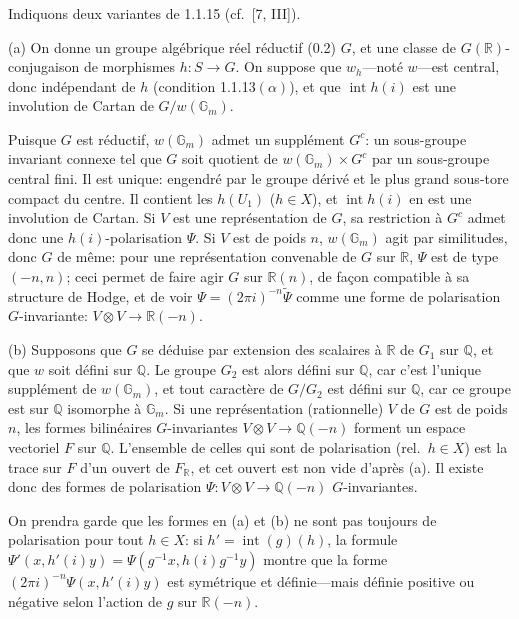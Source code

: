 \documentclass[12pt,a4paper]{article}
\theoremstyle{plain}
\theoremstyle{definition}
\theoremstyle{remark}
\DeclareMathOperator{\Int}{int}
\newcommand{\QQ}{\mathbb{Q}}
\newcommand{\RR}{\mathbb{R}}
\newcommand{\Gm}{\mathbb{G}}
\begin{document}
\subsubsection{}

Indiquons deux variantes de 1.1.15 (cf.~[7, III]).

(a) On donne un groupe alg\'ebrique r\'eel r\'eductif (0.2) $G$, et une classe de $G(\RR)$-conjugaison de morphismes $h:S \to G$. On suppose que $w_h$---not\'e $w$---est central, donc ind\'ependant de $h$ (condition 1.1.13$(\alpha)$), et que $\Int h(i)$ est une involution de Cartan de $G/w(\Gm_m)$.

Puisque $G$ est r\'eductif, $w(\Gm_m)$ admet un suppl\'ement $G^c$: un sous-groupe invariant connexe tel que $G$ soit quotient de $w(\Gm_m) \times G^c$ par un sous-groupe central fini. Il est unique: engendr\'e par le groupe d\'eriv\'e et le plus grand sous-tore compact du centre. Il contient les $h(U_1)$ ($h \in X$), et $\Int h(i)$ en est une involution de Cartan. Si $V$ est une repr\'esentation de $G$, sa restriction \`a $G^c$ admet donc une $h(i)$-polarisation $\Psi$. Si $V$ est de poids $n$, $w(\Gm_m)$ agit par similitudes, donc $G$ de m\^eme: pour une repr\'esentation convenable de $G$ sur $\RR$, $\Psi$ est de type $(-n,n)$; ceci permet de faire agir $G$ sur $\RR(n)$, de fa\c{c}on compatible \`a sa structure de Hodge, et de voir $\Psi = (2\pi i)^{-n}\tilde{\Psi}$ comme une forme de polarisation $G$-invariante: $V \otimes V \to \RR(-n)$.

(b) Supposons que $G$ se d\'eduise par extension des scalaires \`a $\RR$ de $G_1$ sur $\QQ$, et que $w$ soit d\'efini sur $\QQ$. Le groupe $G_2$ est alors d\'efini sur $\QQ$, car c'est l'unique suppl\'ement de $w(\Gm_m)$, et tout caract\`ere de $G/G_2$ est d\'efini sur $\QQ$, car ce groupe est sur $\QQ$ isomorphe \`a $\Gm_m$. Si une repr\'esentation (rationnelle) $V$ de $G$ est de poids $n$, les formes bilin\'eaires $G$-invariantes $V \otimes V \to \QQ(-n)$ forment un espace vectoriel $F$ sur $\QQ$. L'ensemble de celles qui sont de polarisation (rel.~$h \in X$) est la trace sur $F$ d'un ouvert de $F_{\RR}$, et cet ouvert est non vide d'apr\`es (a). Il existe donc des formes de polarisation $\Psi:V \otimes V \to \QQ(-n)$ $G$-invariantes.

On prendra garde que les formes en (a) et (b) ne sont pas toujours de polarisation pour tout $h \in X$: si $h' = \Int(g)(h)$, la formule $\Psi'(x,h'(i)y) = \Psi(g^{-1}x,h(i)g^{-1}y)$ montre que la forme $(2\pi i)^{-n}\Psi(x,h'(i)y)$ est sym\'etrique et d\'efinie---mais d\'efinie positive ou n\'egative selon l'action de $g$ sur $\RR(-n)$.
\end{document}
